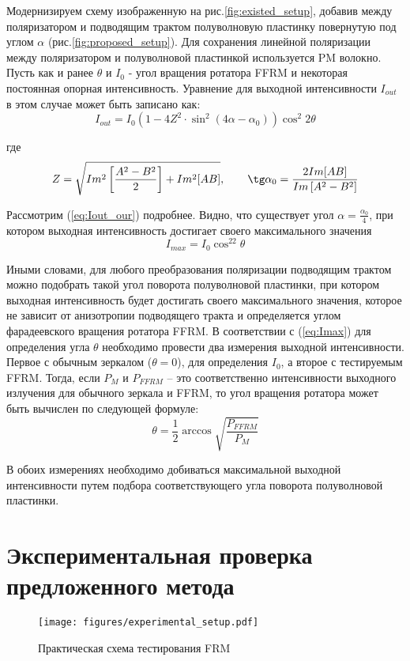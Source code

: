 \documentclass{article}
\begin{document}
Модернизируем схему изображенную на рис.\ref{fig:existed_setup}, добавив  между поляризатором и подводящим трактом полуволновую пластинку повернутую под углом $\alpha$ (рис.\ref{fig:proposed_setup}). Для сохранения линейной поляризации между поляризатором и полуволновой пластинкой используется PM волокно. Пусть как и ранее $\theta$ и $I_0$ -  угол вращения ротатора FFRM и некоторая постоянная опорная интенсивность.  Уравнение для выходной интенсивности $I_{out}$ в этом случае  может быть записано как:
\begin{equation}
	\label{eq:Iout_our}
	I_{out} =  I_0 \left( 1 - 4 Z^2 \cdot \sin^2(4\alpha - \alpha_0)\right)  \cos^2 2 \theta
\end{equation}

где
\begin{equation}
	Z = \sqrt{Im^2\left[\frac{A^2-B^2}{2}\right]+Im^2[AB]}, \qquad  \tg\alpha_0 = \frac{2Im[AB]}{Im\left[A^2 - B^2\right]}
\end{equation}

Рассмотрим (\ref{eq:Iout_our}) подробнее. Видно, что существует угол $\alpha = \frac{\alpha_0}{4}$, при котором выходная интенсивность достигает своего максимального значения
\begin{equation}
	\label{eq:Imax}
	I_{max} = I_0\cos^22\theta
\end{equation}

Иными словами, для любого преобразования поляризации подводящим трактом можно подобрать такой угол поворота полуволновой пластинки, при котором выходная интенсивность будет достигать своего максимального значения, которое не зависит от анизотропии подводящего тракта и определяется углом фарадеевского вращения ротатора FFRM. 
В соответствии с (\ref{eq:Imax}) для определения угла $\theta$ необходимо провести два измерения выходной интенсивности. Первое с обычным зеркалом ($\theta=0$), для определения $I_0$, а второе с тестируемым FFRM. Тогда, если $P_M$ и $P_{FFRM}$ – это соответственно интенсивности выходного излучения для обычного зеркала и FFRM, то угол вращения ротатора может быть вычислен по следующей формуле:
\begin{equation}
	\label{eq:theta}
	\theta=\frac{1}{2}\arccos\sqrt{\frac{P_{FFRM}}{P_M}}
\end{equation}

В обоих измерениях необходимо добиваться максимальной выходной интенсивности путем подбора соответствующего угла поворота полуволновой пластинки. 

\section{Экспериментальная проверка предложенного метода}
\begin{figure}[b]
	\centering
	\texttt{[image: figures/experimental\_setup.pdf]}
	\caption{Практическая схема тестирования FRM}
	\label{fig:experimantalScheme}
\end{figure}
\end{document}
